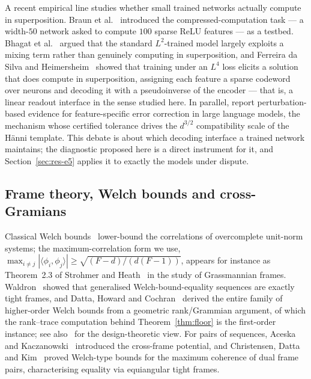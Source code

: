 A recent empirical line studies whether small trained networks actually compute in
superposition. Braun et al.~\cite{braun2025apd} introduced the compressed-computation task ---
a width-$50$ network asked to compute $100$ sparse ReLU features --- as a testbed. Bhagat et
al.~\cite{bhagat2026cc} argued that the standard $L^2$-trained model largely exploits a mixing
term rather than genuinely computing in superposition, and Ferreira da Silva and
Heimersheim~\cite{ferreiradasilva2026l4} showed that training under an $L^4$ loss elicits a
solution that does compute in superposition, assigning each feature a sparse codeword over
neurons and decoding it with a pseudoinverse of the encoder --- that is, a linear readout
interface in the sense studied here. In parallel,
\cite{ferreiradasilva2026errcorr} report perturbation-based evidence for feature-specific
error correction in large language models, the mechanism whose certified tolerance drives the
$d^{3/2}$ compatibility scale of the H\"{a}nni template. This debate is about which decoding
interface a trained network maintains; the diagnostic proposed here is a direct instrument for
it, and Section~\ref{sec:res-e5} applies it to exactly the models under dispute.

\subsection{Frame theory, Welch bounds and cross-Gramians}
\label{sec:frames}

Classical Welch bounds~\cite{welch1974lower} lower-bound the correlations of overcomplete
unit-norm systems; the maximum-correlation form we use,
$\max_{i\neq j}|\langle\phi_i,\phi_j\rangle|\ge\sqrt{(F-d)/(d(F-1))}$, appears for instance as
Theorem~2.3 of Strohmer and Heath~\cite{strohmer2003grassmannian} in the study of Grassmannian
frames. Waldron~\cite{waldron2003generalized} showed that generalised Welch-bound-equality
sequences are exactly tight frames, and Datta, Howard and Cochran~\cite{datta2012geometry}
derived the entire family of higher-order Welch bounds from a geometric rank/Grammian
argument, of which the rank--trace computation behind Theorem~\ref{thm:floor} is the
first-order instance; see also~\cite{klappenecker2005mub} for the design-theoretic view. For
pairs of sequences, Aceska and Kaczanowski~\cite{aceska2022crossframe} introduced the
cross-frame potential, and Christensen, Datta and Kim~\cite{christensen2020welch} proved
Welch-type bounds for the maximum coherence of dual frame pairs, characterising equality via
equiangular tight frames.

